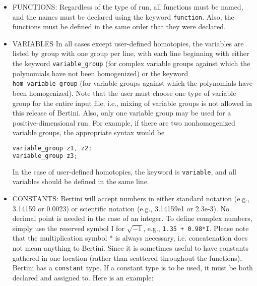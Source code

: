 \begin{itemize}

\item{FUNCTIONS:}
Regardless of the type of run, all functions must be named, and the names must be declared using the keyword \texttt{function}. Also, the functions must be defined in the same order that they were declared.

\item{VARIABLES}
In all cases except user-defined homotopies, the variables are listed by group with one group per line, with each line beginning with either the keyword \texttt{variable\_group} (for complex variable groups against which the polynomials have not been homogenized) or the keyword \texttt{hom\_variable\_group} (for variable groups against which the polynomials have been homogenized).
 Note that the user must choose one type of variable group for the entire input file, i.e., mixing of variable groups is not allowed in this release of Bertini. Also, only one variable group may be used for a positive-dimensional run. For example, if there are two
 nonhomogenized variable groups, the appropriate syntax would be
\begin{center}\begin{minipage}{0.9\linewidth}

\begin{lstlisting}[language=c++, caption=Adapted from \cite{BM13}, captionpos=b]
variable_group z1, z2;
variable_group z3;
\end{lstlisting}
\end{minipage}\end{center}

In the case of user-defined homotopies, the keyword is \texttt{variable}, and all variables should be defined in the same line.





\item{CONSTANTS:}
Bertini will accept numbers in either standard notation (e.g., 3.14159 or 0.0023) or scientific notation (e.g., 3.14159e1 or 2.3e-3). No decimal point is needed in the case of an integer. To define complex numbers, simply use the reserved symbol I for $\sqrt{-1}$, e.g., \texttt{1.35 + 0.98*I}. Please note that the multiplication symbol * is always necessary, i.e. concatenation does not
 mean anything to Bertini. Since it is sometimes useful to have constants gathered in one location (rather than scattered
 throughout the functions), Bertini has a \texttt{constant} type. If a constant type is to be used, it must be both declared and assigned to. Here is an example:
\begin{center}\begin{minipage}{0.9\linewidth}


\end{minipage}
\end{center}
\end{itemize}
